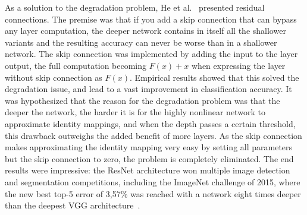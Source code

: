 \documentclass[english,twoside,openright]{UH_DS_MSc}
\begin{document}
As a solution to the degradation problem, He et al.~\cite{resnet} presented residual connections.
The premise was that if you add a skip connection that can bypass any layer computation, 
the deeper network contains in itself all the shallower variants and the resulting accuracy can never 
be worse than in a shallower network. The skip connection was implemented by adding the input to the layer output, the full computation becoming
$F(x) + x$ when expressing the layer without skip connection as $F(x)$.
Empirical results showed that this solved the degradation issue, and lead to a 
vast improvement in classification accuracy. It was hypothesized that the reason for the degradation problem 
was that the deeper the network, the harder it is for the highly nonlinear network to approximate identity mappings, and when 
the depth passes a certain threshold, this drawback outweighs the added benefit of more layers. As the skip 
connection makes approximating the identity mapping very easy by setting all parameters but the skip connection to zero, the problem is completely eliminated. The end results were impressive: 
the ResNet architecture won multiple image detection and segmentation competitions, including the ImageNet challenge 
of 2015, where the new best top-5 error of 3,57\% was reached with a network eight times deeper than the deepest VGG architecture~\cite{resnet}.
\end{document}
